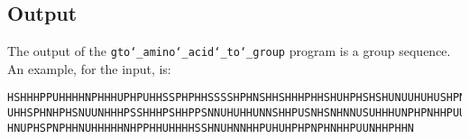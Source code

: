 \subsection*{Output}

The output of the \texttt{gto\char`_amino\char`_acid\char`_to\char`_group} program is a group sequence.\\
An example, for the input, is:
\begin{lstlisting}
HSHHHPPUHHHHNPHHHUPHPUHHSSPHPHHSSSSHPHNSHHSHHHPHHSHUHPHSHSHUNUUHUHUSHPNHUHUSUUHS
UHHSPHNHPHSNUUNHHHPSSHHHPSHHPPSNNUHUHHUNNSHHPUSNHSNHNNUSUHHHUNPHPNHHPUUUSPHHHSUH
HNUPHSPNPHHNUHHHHHNHPPHHUHHHHSSHNUHNNHHPUHUHPHPNPHNHHPUUNHHPHHN
\end{lstlisting}
